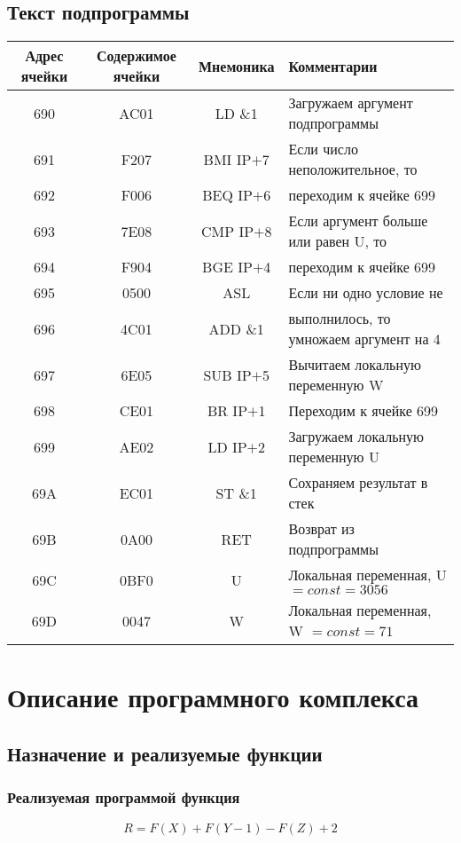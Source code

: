 \newpage

\subsection{Текст подпрограммы}
\begin{center}
\begin{tabular}{|c|c|c|l|}
\hline
\textbf{Адрес ячейки} & \textbf{Содержимое ячейки} & \textbf{Мнемоника} & \textbf{Комментарии}\\
\hline
690 & AC01 & LD \&1 & Загружаем аргумент подпрограммы\\
691 & F207 & BMI IP$+$7 & Если число неположительное, то\\
692 & F006 & BEQ IP$+$6 & переходим к ячейке 699\\
693 & 7E08 & CMP IP$+$8 & Если аргумент больше или равен U, то\\
694 & F904 & BGE IP$+$4 & переходим к ячейке 699\\
695 & 0500 & ASL & Если ни одно условие не\\
696 & 4C01 & ADD \&1 & выполнилось, то умножаем аргумент на 4\\
697 & 6E05 & SUB IP$+$5 & Вычитаем локальную переменную W\\
698 & CE01 & BR IP$+$1 & Переходим к ячейке 699\\
699 & AE02 & LD IP$+$2 & Загружаем локальную переменную U\\
69A & EC01 & ST \&1 & Сохраняем результат в стек\\
69B & 0A00 & RET & Возврат из подпрограммы\\
\hline
69C & 0BF0 & U & Локальная переменная, U $=const=3056$\\
69D & 0047 & W & Локальная переменная, W $=const=71$\\
\hline
\end{tabular}
\end{center}

\section{Описание программного комплекса}
\subsection{Назначение и реализуемые функции}
\subsubsection{Реализуемая программой функция}
$$R=F(X)+F(Y-1)-F(Z)+2$$

